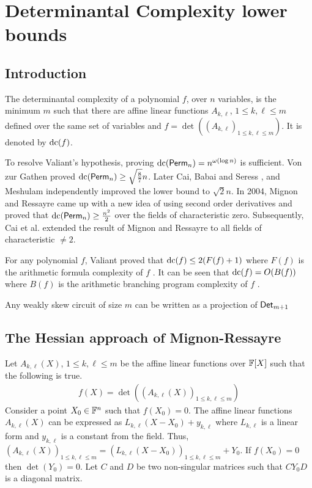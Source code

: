 \chapter{Determinantal Complexity lower bounds}
\section{Introduction}
\begin{definition}
  The determinantal complexity of a polynomial $f$, over $n$ variables, is the minimum $m$ such that there are affine linear functions $A_{k,\ell}$, $1\leq k,\ell\leq m$ defined over the same set of variables and $f= \det((A_{k,\ell})_{1 \leq k,\ell \leq m})$. It is denoted by $\mathrm{dc}(f)$.  
\end{definition}
To resolve Valiant's hypothesis, proving $\mathrm{dc}(\mathsf{Perm}_n) = n^{\omega(\log n)}$ is sufficient. Von zur Gathen \cite{von1986}  proved $\mathrm{dc}(\mathsf{Perm}_n) \geq \sqrt{\frac{8}{7}}n$. Later Cai\cite{cai1990}, Babai and Seress \cite{von1987}, and Meshulam\cite{mesh1989} independently improved the lower bound to $\sqrt{2}n$. In 2004, Mignon and Ressayre\cite{mr04} came up with a new idea of using second order derivatives and proved that $\mathrm{dc}(\mathsf{Perm}_n) \geq \frac{n^2}{2}$ over the fields of characteristic zero. Subsequently, Cai et al.\cite{ccl2008} extended the result of Mignon and Ressayre to all fields of characteristic $\neq 2$.

For any polynomial $f$, Valiant proved that $\mathrm{dc}(f) \leq 2(F(f)+ 1)$ where $F(f)$ is the arithmetic formula complexity of $f$ \cite{v79}. It can be seen that $\mathrm{dc}(f) = O(B(f))$ where $B(f)$ is the arithmetic branching program complexity of $f$ \cite{mp08}.

\begin{remark}[\cite{mp08}]
  Any weakly skew circuit of size $m$ can be written as a projection of $\mathsf{Det}_{m+1}$
\end{remark}


\section{The Hessian approach of Mignon-Ressayre}

 Let $A_{k,\ell}(X)$, $1\leq k,\ell\leq m$ be the affine linear functions over $\mathbb{F}[X]$ such that the following is true.
\begin{align*}
  f(X) = \det((A_{k,\ell}(X))_{1\leq k,\ell\leq m})
\end{align*}
 Consider a point $X_0\in \mathbb{F}^{n}$ such that $f(X_0)=0$. The affine linear functions $A_{k,\ell}(X)$ can be expressed as $L_{k,\ell}(X-X_0) + y_{k,\ell}$ where $L_{k,\ell}$ is a linear form and $y_{k,\ell}$ is a constant from the field. Thus, $(A_{k,\ell}(X))_{1\leq k,\ell\leq m} = (L_{k,\ell}(X-X_0))_{1\leq k,\ell\leq m} + Y_0$. If $f(X_0)=0$ then $\det(Y_0)=0$. Let $C$ and $D$ be two non-singular matrices such that $CY_0D$ is a diagonal matrix.

